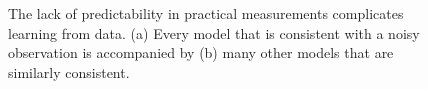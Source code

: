 \documentclass[
  letterpaper,
  DIV=11,
  numbers=noendperiod]{scrartcl}
\begin{document}
\begin{figure}

\begin{minipage}[t]{0.50\linewidth}

{\centering 


}

\subcaption{\label{fig-consistent-config1}}
\end{minipage}%
%
\begin{minipage}[t]{0.50\linewidth}

{\centering 


}

\subcaption{\label{fig-consistent-config3}}
\end{minipage}%

\caption{\label{fig-consistent-configs}The lack of predictability in
practical measurements complicates learning from data. (a) Every model
that is consistent with a noisy observation is accompanied by (b) many
other models that are similarly consistent.}

\end{figure}
\end{document}
